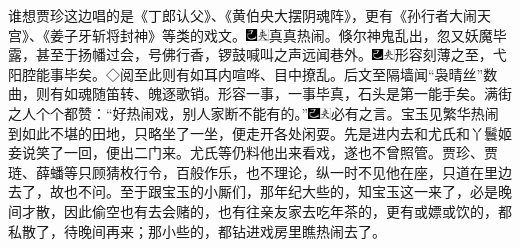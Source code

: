 谁想贾珍这边唱的是《丁郎认父》、《黄伯央大摆阴魂阵》，更有《孙行者大闹天宫》、《姜子牙斩将封神》等类的戏文。{\includegraphics[width=3mm]{../Images/00003}\includegraphics[width=3mm]{../Images/00012}\footnotesize \kaishu 真真热闹。}倏尔神鬼乱出，忽又妖魔毕露，甚至于扬幡过会，号佛行香，锣鼓喊叫之声远闻巷外。{\includegraphics[width=3mm]{../Images/00003}\includegraphics[width=3mm]{../Images/00012}\footnotesize \kaishu 形容刻薄之至，弋阳腔能事毕矣。◇阅至此则有如耳内喧哗、目中撩乱。后文至隔墙闻``袅晴丝''数曲，则有如魂随笛转、魄逐歌销。形容一事，一事毕真，石头是第一能手矣。}满街之人个个都赞：``好热闹戏，别人家断不能有的。''{\includegraphics[width=3mm]{../Images/00003}\includegraphics[width=3mm]{../Images/00012}\footnotesize \kaishu 必有之言。}宝玉见繁华热闹到如此不堪的田地，只略坐了一坐，便走开各处闲耍。先是进内去和尤氏和丫鬟姬妾说笑了一回，便出二门来。尤氏等仍料他出来看戏，遂也不曾照管。贾珍、贾琏、薛蟠等只顾猜枚行令，百般作乐，也不理论，纵一时不见他在座，只道在里边去了，故也不问。至于跟宝玉的小厮们，那年纪大些的，知宝玉这一来了，必是晚间才散，因此偷空也有去会赌的，也有往亲友家去吃年茶的，更有或嫖或饮的，都私散了，待晚间再来；那小些的，都钻进戏房里瞧热闹去了。

